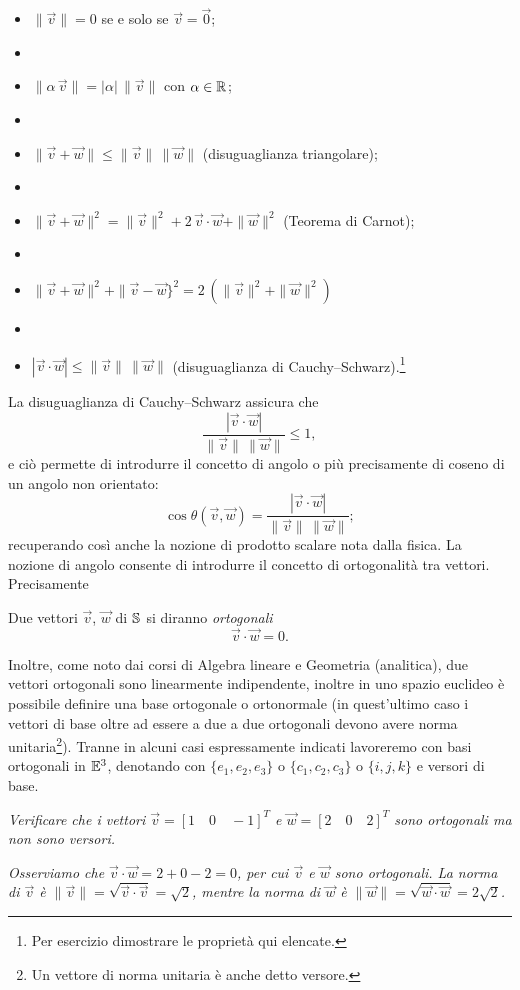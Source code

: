 \begin{proprieta}
  \begin{itemize}
    \item $\| \vec v \| = 0$ se e solo se $\vec v = \vec 0$;
    \item[]
    \item $\| \alpha\,\vec v\| = |\alpha|\, \|\vec v \|$ con $\alpha\in\mathbb{R}^{}$;
    \item[]
    \item $\| \vec v+\vec w \| \le \|\vec v\|\, \|\vec w\|$ (disuguaglianza 
triangolare);
    \item[]
    \item $\| \vec v+\vec w \|^2 = \|\vec v\|^2 + 2\, \vec v\cdot \vec w + 
\|\vec w\|^2$ (Teorema di Carnot);
    \item[]
    \item $\|\vec v+\vec w\|^2 + \|\vec v-\vec w\}^2 = 2\, \left(\|\vec v\|^2 
+\|\vec w\|^2 \right)$ 
    \item[]
    \item $|\vec v\cdot \vec w|\le\|\vec v\|\,\|\vec w\|$ (disuguaglianza di 
Cauchy--Schwarz).\footnote{Per esercizio dimostrare le proprietà qui 
elencate.}
  \end{itemize}
\end{proprieta}
La disuguaglianza di Cauchy--Schwarz assicura che
\[
  \frac{|\vec v\cdot \vec w|}{\|\vec v\|\, \|\vec w\|}\le 1,
\]
e ciò permette di introdurre il concetto di angolo o più precisamente 
di coseno di un angolo non orientato:
\[
  \cos\theta(\vec v,\vec w) = \frac{|\vec v\cdot \vec w|}{\|\vec v\|\, \|\vec 
w\|};
\]
recuperando così anche la nozione di prodotto scalare nota dalla fisica.
La nozione di angolo consente di introdurre il concetto di ortogonalità tra 
vettori. Precisamente 
\begin{definizione}   
  Due vettori $\vec v$, $\vec w$ di $\mathbb{S}^{}$ si diranno \textit{ortogonali} 
  \[
    \vec v\cdot \vec w = 0.
  \]
\end{definizione}  
Inoltre, come noto dai corsi di Algebra lineare e Geometria (analitica), due 
vettori 
ortogonali sono linearmente indipendente, inoltre in uno spazio euclideo è 
possibile
definire una base ortogonale o ortonormale (in quest'ultimo caso i vettori di 
base oltre ad
essere a due a due ortogonali devono avere norma unitaria\footnote{Un vettore 
di 
norma unitaria è anche detto versore.}). Tranne in alcuni 
casi espressamente indicati lavoreremo con basi ortogonali in $\mathbb{E}^{3}$, 
denotando con
$\{e_1,e_2,e_3\}$ o $\{c_1,c_2,c_3\}$ o $\{i,j,k\}$ e versori di base.
\begin{esempio}
  \textit{Verificare che i vettori $\vec v= [1\quad 0 \quad -1]^T$ e $\vec w = 
[2\quad 0 \quad 2]^T$ sono ortogonali ma non sono versori.}
\end{esempio}
\begin{sol}
  \textit{Osserviamo che $\vec v\cdot \vec w = 2+0-2 = 0$, per cui $\vec v$ e 
$\vec w$ sono ortogonali. 
La norma di $\vec v$ è $\|\vec v\| = \sqrt{\vec v\cdot \vec v} = \sqrt 2$,
mentre la norma di $\vec w$ 
è $\|\vec w\| = \sqrt{\vec w\cdot \vec w} = 2\sqrt 2$.} 
\end{sol}

